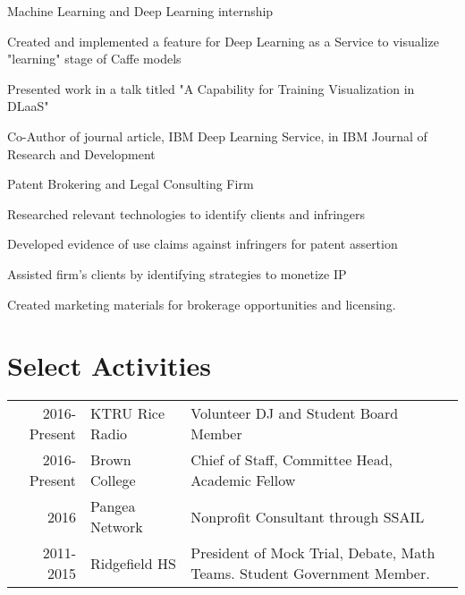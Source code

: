 \documentclass[]{ajk-resume}
\begin{document}
\begin{minipage}[t]{0.66\textwidth}
\begin{tightemize}
\item Machine Learning and Deep Learning internship
\item Created and implemented a feature for Deep Learning as a Service to visualize "learning" stage of Caffe models
\item Presented work in a talk titled "A Capability for Training Visualization in DLaaS"
\item Co-Author of journal article, IBM Deep Learning Service, in IBM Journal of Research and Development 
\end{tightemize}
\sectionsep

Patent Brokering and Legal Consulting Firm 
\begin{tightemize}
\item Researched relevant technologies to identify clients and infringers
\item Developed evidence of use claims against infringers for patent assertion 
\item Assisted firm's clients by identifying strategies to monetize IP 
\item Created marketing materials for brokerage opportunities and licensing.
\end{tightemize}
\sectionsep





\section{Select Activities} 

\begin{tabular}{r l p{7cm}}
2016-Present & KTRU Rice Radio & Volunteer DJ and Student Board Member\\
2016-Present & Brown College & Chief of Staff, Committee Head, Academic Fellow\\
2016 & Pangea Network & Nonprofit Consultant through SSAIL\\
2011-2015 &  Ridgefield HS & President of Mock Trial, Debate, Math Teams. Student Government Member.
\end{tabular}
\sectionsep

\end{minipage} 
\end{document}
